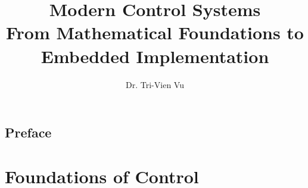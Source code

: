 \documentclass[11pt,oneside]{book}
\begin{document}
	
	
	\frontmatter
	
	\title{\textbf{Modern Control Systems}\\[1ex]
	\large From Mathematical Foundations to Embedded Implementation}
	\author{Dr. Tri-Vien Vu}
	\date{}
	\maketitle
	
	\chapter*{Preface}
	
	\tableofcontents
	
	
	\mainmatter
	
	\part{Foundations of Control}
	
	
	
	
	
	\backmatter
	
	
	
	
\end{document}
